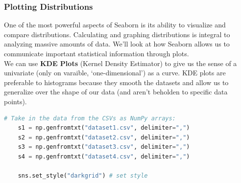 \documentclass[11pt, a4paper]{article}
\begin{document}
\begin{spacing}{1.1}
	\subsubsection{Plotting Distributions}
	One of the most powerful aspects of Seaborn is its ability to visualize and compare distributions. Calculating and graphing distributions is integral to analyzing massive amounts of data. We’ll look at how Seaborn allows us to communicate important statistical information through plots. \vspace*{2mm} \\
	We can use \textbf{KDE Plots} (Kernel Density Estimator) to give us the sense of a univariate (only on varaible, `one-dimensional') as a curve. KDE plots are preferable to histograms because they smooth the datasets and allow us to generalize over the shape of our data (and aren't beholden to specific data points).
	\begin{minipage}[c]{10.3cm}
	\begin{lstlisting}[language=Python]
	# Take in the data from the CSVs as NumPy arrays:
	s1 = np.genfromtxt("dataset1.csv", delimiter=",")
	s2 = np.genfromtxt("dataset2.csv", delimiter=",")
	s3 = np.genfromtxt("dataset3.csv", delimiter=",")
	s4 = np.genfromtxt("dataset4.csv", delimiter=",")
	
	sns.set_style("darkgrid") # set style
	

\end{lstlisting}
\end{minipage}
\end{spacing}
\end{document}
